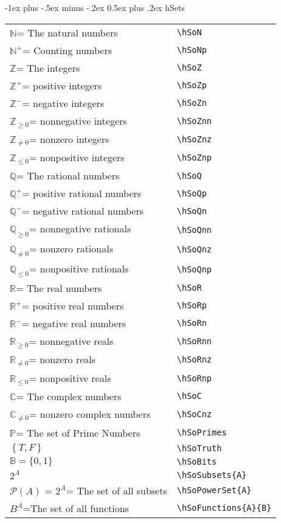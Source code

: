 \documentclass[a4paper,10pt,landscape]{article}
\makeatletter
\theoremstyle{definition}
\theoremstyle{remark}
\newcommand{\hSoN}  {\ensuremath{\mathbb{N}}}      %
\newcommand{\hSoNp} {\ensuremath{\mathbb{N}^{+}}} %
\newcommand{\hSoZ}  {\ensuremath{\mathbb{Z}}}      %
\newcommand{\hSoZp} {\ensuremath{\mathbb{Z}^{+}}} %
\newcommand{\hSoZn} {\ensuremath{\mathbb{Z}^{-}}} %
\newcommand{\hSoZnn}{\ensuremath{\mathbb{Z}_{\ge 0}}} %
\newcommand{\hSoZnz}{\ensuremath{\mathbb{Z}_{\neq 0}}} %
\newcommand{\hSoZnp}{\ensuremath{\mathbb{Z}_{\le 0}}} %
\newcommand{\hSoQ}  {\ensuremath{\mathbb{Q}}}      %
\newcommand{\hSoQp} {\ensuremath{\mathbb{Q}^{+}}} %
\newcommand{\hSoQn} {\ensuremath{\mathbb{Q}^{-}}} %
\newcommand{\hSoQnn}{\ensuremath{\mathbb{Q}_{\ge 0}}} %
\newcommand{\hSoQnz}{\ensuremath{\mathbb{Q}_{\neq 0}}} %
\newcommand{\hSoQnp}{\ensuremath{\mathbb{Q}_{\le 0}}} %
\newcommand{\hSoR}  {\ensuremath{\mathbb{R}}}      %
\newcommand{\hSoRp} {\ensuremath{\mathbb{R}^{+}}} %
\newcommand{\hSoRn} {\ensuremath{\mathbb{R}^{-}}} %
\newcommand{\hSoRnn}{\ensuremath{\mathbb{R}_{\ge 0}}} %
\newcommand{\hSoRnz}{\ensuremath{\mathbb{R}_{\neq 0}}} %
\newcommand{\hSoRnp}{\ensuremath{\mathbb{R}_{\le 0}}} %
\newcommand{\hSoC}  {\ensuremath{\mathbb{C}}}      %
\newcommand{\hSoCnz}{\ensuremath{\mathbb{C}_{\neq 0}}} %
\newcommand{\hSoPrimes}{\ensuremath{\mathbb{P}}} %
\newcommand{\hSoTruth}{\ensuremath{\left \{ T, F \right \}}} %
\newcommand{\hSoBits}{\ensuremath{\mathbb{B}}} %
\newcommand{\hSoFunctions}[2]{\ensuremath{#2^{#1}}} %
\newcommand{\hSoSubsets}[1]{\ensuremath{2^{#1}}} %
\newcommand{\hSoPowerSet}[1]{\ensuremath{\mathcal{P}(#1)}} %
\renewcommand{\section}{\@startsection{section}{1}{0mm}%
                                {-1ex plus -.5ex minus -.2ex}%
                                {0.5ex plus .2ex}%
                                {\normalfont\large\bfseries}}
\makeatother
\begin{document}
\begin{multicols}{3}
\section{hSets}
\begin{tabular}{@{}ll@{}}
	\hSoN = The natural numbers	&\verb!\hSoN!\\
	\hSoNp = Counting numbers	&\verb!\hSoNp!\\
	\hSoZ = The integers	&\verb!\hSoZ!\\
	\hSoZp = positive integers	&\verb!\hSoZp!\\
	\hSoZn = negative integers	&\verb!\hSoZn! \\
	\hSoZnn = nonnegative integers	&\verb!\hSoZnn!\\
	\hSoZnz = nonzero integers	&\verb!\hSoZnz!\\
	\hSoZnp = nonpositive integers	&\verb!\hSoZnp!\\
	\hSoQ = The rational numbers	&\verb!\hSoQ!\\
	\hSoQp = positive rational numbers	&\verb!\hSoQp!\\
	\hSoQn = negative rational numbers	&\verb!\hSoQn!\\
	\hSoQnn = nonnegative rationals	&\verb!\hSoQnn!\\
	\hSoQnz = nonzero rationals	&\verb!\hSoQnz!\\
	\hSoQnp = nonpositive rationals	&\verb!\hSoQnp!\\
	\hSoR = The real numbers	&\verb!\hSoR!\\
	\hSoRp = positive real numbers	&\verb!\hSoRp!\\
	\hSoRn = negative real numbers	&\verb!\hSoRn!\\
	\hSoRnn = nonnegative reals	&\verb!\hSoRnn!\\
	\hSoRnz = nonzero reals	&\verb!\hSoRnz!\\
	\hSoRnp = nonpositive reals	&\verb!\hSoRnp!\\
	\hSoC = The complex numbers	&\verb!\hSoC!\\
	\hSoCnz = nonzero complex numbers	&\verb!\hSoCnz!\\
	\hSoPrimes = The set of Prime Numbers	&\verb!\hSoPrimes!\\
	\hSoTruth	&\verb!\hSoTruth! \\
	$\hSoBits = \{ 0, 1 \}$	&\verb!\hSoBits!\\
	$\hSoSubsets{A}$	&\verb!\hSoSubsets{A}!\\
	$\hSoPowerSet{A}$ = $\hSoSubsets{A}$= The set of all subsets	&\verb!\hSoPowerSet{A}! \\
	$\hSoFunctions{A}{B}$=The set of all functions	&\verb!\hSoFunctions{A}{B}!\\
\end{tabular}
\end{multicols}
\end{document}
